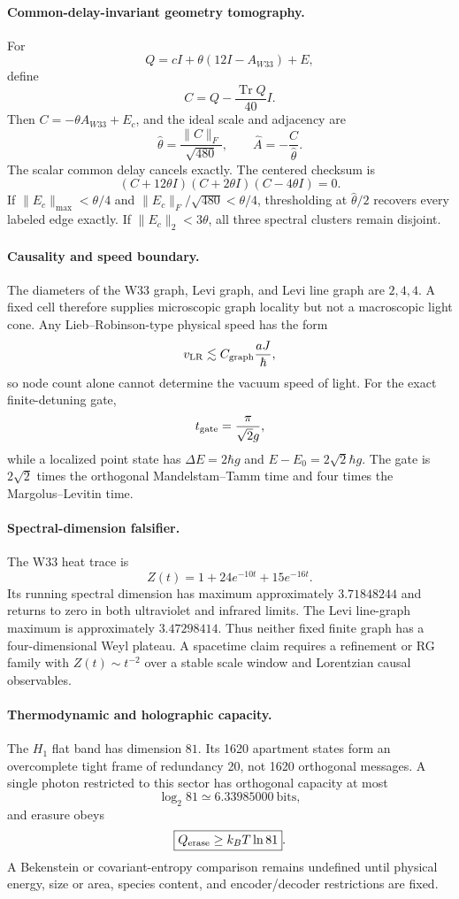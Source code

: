 \paragraph{Common-delay-invariant geometry tomography.}
For
\[
Q=cI+\theta(12I-A_{W33})+E,
\]
define
\[
C=Q-\frac{\operatorname{Tr}Q}{40}I.
\]
Then $C=-\theta A_{W33}+E_c$, and the ideal scale and adjacency are
\[
\boxed{\widehat\theta=\frac{\|C\|_F}{\sqrt{480}}},
\qquad
\boxed{\widehat A=-\frac{C}{\widehat\theta}}.
\]
The scalar common delay cancels exactly.  The centered checksum is
\[
\boxed{(C+12\theta I)(C+2\theta I)(C-4\theta I)=0}.
\]
If $\|E_c\|_{\max}<\theta/4$ and
$\|E_c\|_F/\sqrt{480}<\theta/4$, thresholding at
$\widehat\theta/2$ recovers every labeled edge exactly.  If
$\|E_c\|_2<3\theta$, all three spectral clusters remain disjoint.

\paragraph{Causality and speed boundary.}
The diameters of the W33 graph, Levi graph, and Levi line graph are $2,4,4$.
A fixed cell therefore supplies microscopic graph locality but not a
macroscopic light cone.  Any Lieb--Robinson-type physical speed has the form
\[
v_{\rm LR}\lesssim C_{\rm graph}\frac{aJ}{\hbar},
\]
so node count alone cannot determine the vacuum speed of light.  For the exact
finite-detuning gate,
\[
t_{\rm gate}=\frac{\pi}{\sqrt2g},
\]
while a localized point state has $\Delta E=2\hbar g$ and
$E-E_0=2\sqrt2\hbar g$.  The gate is $2\sqrt2$ times the orthogonal
Mandelstam--Tamm time and four times the Margolus--Levitin time.

\paragraph{Spectral-dimension falsifier.}
The W33 heat trace is
\[
Z(t)=1+24e^{-10t}+15e^{-16t}.
\]
Its running spectral dimension has maximum approximately $3.71848244$ and
returns to zero in both ultraviolet and infrared limits.  The Levi line-graph
maximum is approximately $3.47298414$.  Thus neither fixed finite graph has a
four-dimensional Weyl plateau.  A spacetime claim requires a refinement or RG
family with $Z(t)\sim t^{-2}$ over a stable scale window and Lorentzian causal
observables.

\paragraph{Thermodynamic and holographic capacity.}
The $H_1$ flat band has dimension $81$.  Its 1620 apartment states form an
overcomplete tight frame of redundancy 20, not 1620 orthogonal messages.  A
single photon restricted to this sector has orthogonal capacity at most
\[
\boxed{\log_2 81\simeq6.33985000\ \text{bits}},
\]
and erasure obeys
\[
\boxed{Q_{\rm erase}\ge k_BT\ln81}.
\]
A Bekenstein or covariant-entropy comparison remains undefined until physical
energy, size or area, species content, and encoder/decoder restrictions are
fixed.

